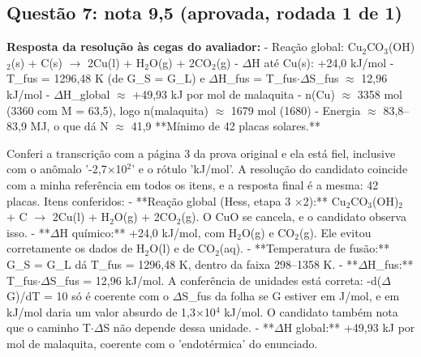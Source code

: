 \documentclass{article}%
\begin{document}
\subsection*{Questão 7: nota 9,5 (aprovada, rodada 1 de 1)}%
\textbf{Resposta da resolução às cegas do avaliador:} {-} Reação global: Cu$_{2}$CO$_{3}$(OH)$_{2}$(s) + C(s) $\to$ 2Cu(l) + H$_{2}$O(g) + 2CO$_{2}$(g)\newline%
{-} $\Delta$H até Cu(s): +24,0 kJ/mol\newline%
{-} T\_fus = 1296,48 K (de G\_S = G\_L) e $\Delta$H\_fus = T\_fus$\cdot$$\Delta$S\_fus $\approx$ 12,96 kJ/mol\newline%
{-} $\Delta$H\_global $\approx$ +49,93 kJ por mol de malaquita\newline%
{-} n(Cu) $\approx$ 3358 mol (3360 com M = 63,5), logo n(malaquita) $\approx$ 1679 mol (1680)\newline%
{-} Energia $\approx$ 83,8--83,9 MJ, o que dá N $\approx$ 41,9\newline%
\newline%
**Mínimo de 42 placas solares.**\par %
Conferi a transcrição com a página 3 da prova original e ela está fiel, inclusive com o anômalo '-2,7$\times$10$^2$' e o rótulo 'kJ/mol'. A resolução do candidato coincide com a minha referência em todos os itens, e a resposta final é a mesma: 42 placas.\newline%
\newline%
Itens conferidos:\newline%
{-} **Reação global (Hess, etapa 3 $\times$2):** Cu$_{2}$CO$_{3}$(OH)$_{2}$ + C $\to$ 2Cu(l) + H$_{2}$O(g) + 2CO$_{2}$(g). O CuO se cancela, e o candidato observa isso.\newline%
{-} **$\Delta$H químico:** +24,0 kJ/mol, com H$_{2}$O(g) e CO$_{2}$(g). Ele evitou corretamente os dados de H$_{2}$O(l) e de CO$_{2}$(aq).\newline%
{-} **Temperatura de fusão:** G\_S = G\_L dá T\_fus = 1296,48 K, dentro da faixa 298--1358 K.\newline%
{-} **$\Delta$H\_fus:** T\_fus$\cdot$$\Delta$S\_fus = 12,96 kJ/mol. A conferência de unidades está correta: -d($\Delta$G)/dT = 10 só é coerente com o $\Delta$S\_fus da folha se G estiver em J/mol, e em kJ/mol daria um valor absurdo de 1,3$\times$10$^{4}$ kJ/mol. O candidato também nota que o caminho T$\cdot$$\Delta$S não depende dessa unidade.\newline%
{-} **$\Delta$H global:** +49,93 kJ por mol de malaquita, coerente com o 'endotérmica' do enunciado.\newline%
$$
\end{document}
